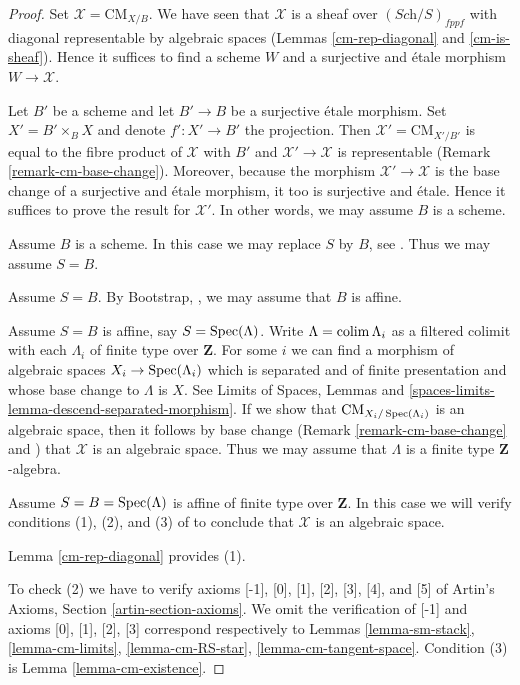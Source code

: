 \documentclass{stacks-project}
\theoremstyle{plain}
\theoremstyle{definition}
\DeclareMathOperator{\Spec}{Spec}
\theoremstyle{remark}
\numberwithin{equation}{subsection}
\def\colim{\mathop{\rm colim}\nolimits}
\def\Spec{\mathop{\rm Spec}}
\def\Sch{\textit{Sch}}
\def\CMfunctor{\mathcal{C}\!{\it oh}}
\def\CMfunctor{\text{CM}}
\begin{document}
\begin{proof}
Set $\mathcal{X} = \CMfunctor_{X/B}$. We have seen that $\mathcal{X}$
is a sheaf over $(\Sch/S)_{fppf}$ with diagonal representable
by algebraic spaces
(Lemmas \ref{cm-rep-diagonal} and \ref{cm-is-sheaf}).
Hence it suffices to find a scheme $W$ and a surjective and \'etale
morphism $W \to \mathcal{X}$.

\medskip\noindent
Let $B'$ be a scheme and let $B' \to B$ be a surjective \'etale morphism.
Set $X' = B' \times_B X$ and denote $f' : X' \to B'$ the projection.
Then $\mathcal{X}' = \CMfunctor_{X'/B'}$ is equal to the fibre
product of $\mathcal{X}$ with $B'$ and $\mathcal{X}'\rightarrow\mathcal{X}$ is representable
(Remark \ref{remark-cm-base-change}). 
Moreover, because the morphism $\mathcal{X}' \to \mathcal{X}$ is the base change of a surjective and \'etale morphism, it too is surjective and \'etale.
Hence it suffices to prove the result for $\mathcal{X}'$.
In other words, we may assume $B$ is a scheme.

\medskip\noindent
Assume $B$ is a scheme. In this case we may replace $S$ by $B$, see
\cite[Tag 03I3]{stacks-project}.
Thus we may assume $S = B$.

\medskip\noindent
Assume $S = B$.
By Bootstrap, \cite[Tag 04SK]{stacks-project}, we may assume that $B$ is affine.

\medskip\noindent
Assume $S = B$ is affine, say $S = \Spec(\Lambda)$.
Write $\Lambda = \colim \Lambda_i$ as a filtered colimit with each $\Lambda_i$
of finite type over $\mathbf{Z}$. For some $i$ we can find
a morphism of algebraic spaces $X_i \to \Spec(\Lambda_i)$
which is separated and of finite presentation and whose base change
to $\Lambda$ is $X$. See Limits of Spaces, Lemmas
\cite[Tag 07SK]{stacks-project} and
\ref{spaces-limits-lemma-descend-separated-morphism}.
If we show that $\CMfunctor_{X_i/\Spec(\Lambda_i)}$ is an
algebraic space, then it follows by base change
(Remark \ref{remark-cm-base-change} and \cite[Tag 03I3]{stacks-project})
that $\mathcal{X}$ is an algebraic space.
Thus we may assume that $\Lambda$ is a finite type $\mathbf{Z}$-algebra.

\medskip\noindent
Assume $S = B = \Spec(\Lambda)$ is affine of finite type over $\mathbf{Z}$.
In this case we will verify conditions (1), (2), and (3) of 
\cite[Tag 07Y1]{stacks-project}
to conclude that $\mathcal{X}$ is an algebraic space.

\medskip\noindent
Lemma \ref{cm-rep-diagonal} provides (1).

\medskip\noindent
To check (2) we have to verify axioms [-1], [0], [1], [2], [3], [4], and [5]
of Artin's Axioms, Section \ref{artin-section-axioms}.
We omit the verification of [-1] and axioms
[0], [1], [2], [3] correspond respectively to
Lemmas \ref{lemma-sm-stack},
\ref{lemma-cm-limits},
\ref{lemma-cm-RS-star},
\ref{lemma-cm-tangent-space}.
Condition (3) is Lemma \ref{lemma-cm-existence}.


\end{proof}
\end{document}

